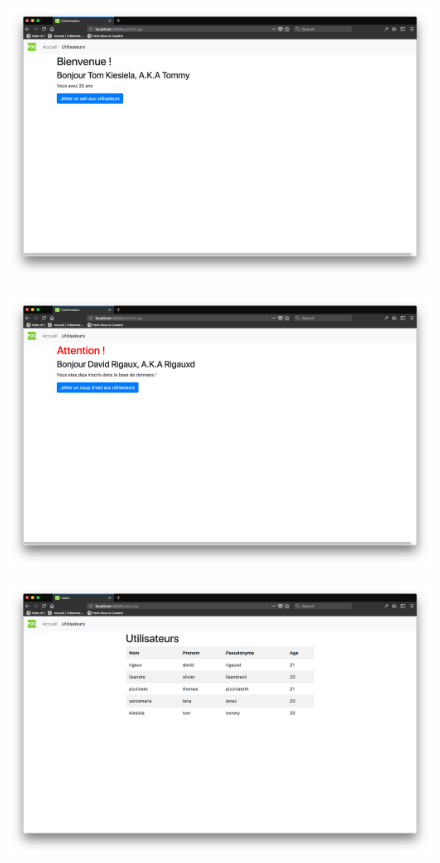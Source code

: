 \documentclass[12pt]{article}
\begin{document}
\begin{figure}[H]
\includegraphics[width=15cm]{images/confirm.png}
\centering
\end{figure}
\begin{figure}[H]
\includegraphics[width=15cm]{images/nonValide.png}
\centering
\end{figure}
\begin{figure}[H]
\includegraphics[width=15cm]{images/users.png}
\centering
\end{figure}
\end{document}

